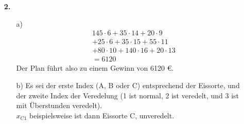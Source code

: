 \documentclass [a4paper,11pt]{article}
\begin{document}
\begin{enumerate}
        \item[\textbf{2.}]
        \begin{enumerate}
            \item[a)]
                \begin{align*}
                145 \cdot 6 + 35 \cdot 14 + 20 \cdot 9 \\
                + 25 \cdot 6 + 35 \cdot 15 + 55 \cdot 11 \\
                + 80 \cdot 10 + 140 \cdot 16 + 20 \cdot 13 \\
                =6120
                \end{align*}
                Der Plan führt also zu einem Gewinn von 6120 \euro.
                \newpage
            \item[b)]
                Es sei der erste Index (A, B oder C) entsprechend der Eissorte, und der zweite Index der Veredelung (1 ist normal, 2 ist veredelt, und 3 ist mit
                Überstunden veredelt).\\
                $x_{C1}$ beispielsweise ist dann Eissorte C, unveredelt.


\end{enumerate}
\end{enumerate}
\end{document}

